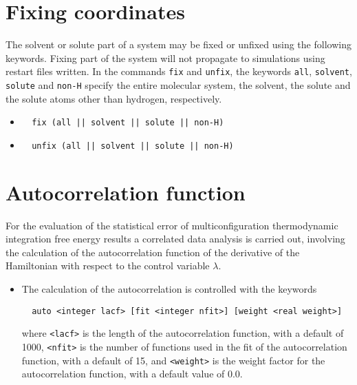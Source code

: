 \section{Fixing coordinates}
The solvent or solute part of a system may be fixed or unfixed using
the following keywords. Fixing part of the system will not propagate to
simulations using restart files written. In the commands \verb+fix+
and \verb+unfix+, the keywords \verb+all+, \verb+solvent+,
\verb+solute+ and \verb+non-H+ specify the entire molecular system,
the solvent, the solute and the solute atoms other than hydrogen,
respectively.
\begin{itemize}
\item
\begin{verbatim}
  fix (all || solvent || solute || non-H)
\end{verbatim}
\item
\begin{verbatim}
  unfix (all || solvent || solute || non-H)
\end{verbatim}
\end{itemize}

\section{Autocorrelation function}
For the evaluation of the statistical error of multiconfiguration
thermodynamic integration free energy results a correlated data 
analysis is carried out, involving the calculation of the
autocorrelation function of the derivative of the Hamiltonian with
respect to the control variable $\lambda$.
\begin{itemize}
\item 
The calculation of the autocorrelation is controlled with the keywords
\begin{verbatim}
  auto <integer lacf> [fit <integer nfit>] [weight <real weight>]
\end{verbatim}
where \verb+<lacf>+ is the length of the autocorrelation function, with
a default of 1000, \verb+<nfit>+ is the number of functions used in the
fit of the autocorrelation function, with a default of 15, and
\verb+<weight>+ is the weight factor for the autocorrelation function,
with a default value of 0.0.
\end{itemize}

